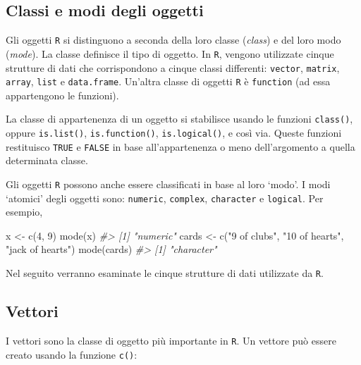 \documentclass[
]{memoir}
\newenvironment{Shaded}{\begin{snugshade}}{\end{snugshade}}
\newcommand{\CommentTok}[1]{\textcolor[rgb]{0.56,0.35,0.01}{\textit{#1}}}
\newcommand{\DecValTok}[1]{\textcolor[rgb]{0.00,0.00,0.81}{#1}}
\newcommand{\FunctionTok}[1]{\textcolor[rgb]{0.00,0.00,0.00}{#1}}
\newcommand{\NormalTok}[1]{#1}
\newcommand{\OtherTok}[1]{\textcolor[rgb]{0.56,0.35,0.01}{#1}}
\newcommand{\StringTok}[1]{\textcolor[rgb]{0.31,0.60,0.02}{#1}}
\theoremstyle{definition}
\theoremstyle{definition}
\theoremstyle{definition}
\theoremstyle{definition}
\theoremstyle{remark}
\begin{document}
\hypertarget{classi-e-modi-degli-oggetti}{%
\subsection{Classi e modi degli oggetti}\label{classi-e-modi-degli-oggetti}}

Gli oggetti \texttt{R} si distinguono a seconda della loro classe (\emph{class}) e
del loro modo (\emph{mode}). La classe definisce il tipo di oggetto. In \texttt{R},
vengono utilizzate cinque strutture di dati che corrispondono a cinque
classi differenti: \texttt{vector}, \texttt{matrix}, \texttt{array}, \texttt{list} e \texttt{data.frame}.
Un'altra classe di oggetti \texttt{R} è \texttt{function} (ad essa appartengono le
funzioni).

La classe di appartenenza di un oggetto si stabilisce usando le funzioni
\texttt{class()}, oppure \texttt{is.list()}, \texttt{is.function()}, \texttt{is.logical()}, e così
via. Queste funzioni restituisco \texttt{TRUE} e \texttt{FALSE} in base
all'appartenenza o meno dell'argomento a quella determinata classe.

Gli oggetti \texttt{R} possono anche essere classificati in base al loro `modo'.
I modi `atomici' degli oggetti sono: \texttt{numeric}, \texttt{complex}, \texttt{character} e
\texttt{logical}. Per esempio,

\begin{Shaded}
\begin{Highlighting}[]
\NormalTok{x }\OtherTok{\textless{}{-}} \FunctionTok{c}\NormalTok{(}\DecValTok{4}\NormalTok{, }\DecValTok{9}\NormalTok{)}
\FunctionTok{mode}\NormalTok{(x)}
\CommentTok{\#\textgreater{} [1] "numeric"}
\NormalTok{cards }\OtherTok{\textless{}{-}} \FunctionTok{c}\NormalTok{(}\StringTok{"9 of clubs"}\NormalTok{, }\StringTok{"10 of hearts"}\NormalTok{, }\StringTok{"jack of hearts"}\NormalTok{)}
\FunctionTok{mode}\NormalTok{(cards)}
\CommentTok{\#\textgreater{} [1] "character"}
\end{Highlighting}
\end{Shaded}

Nel seguito verranno esaminate le cinque strutture di dati utilizzate da
\texttt{R}.

\hypertarget{vettori}{%
\subsection{Vettori}\label{vettori}}

I vettori sono la classe di oggetto più importante in \texttt{R}. Un vettore può
essere creato usando la funzione \texttt{c()}:
\end{document}
